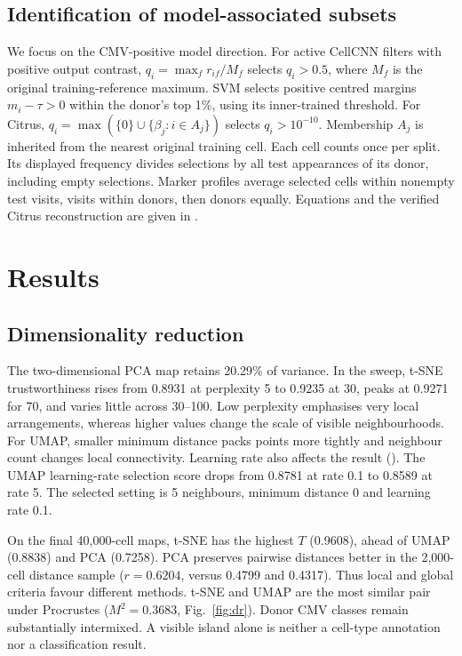 \documentclass[11pt,a4paper]{article}
\begin{document}
\subsection{Identification of model-associated subsets}
We focus on the CMV-positive model direction. For active CellCNN filters with positive output contrast, $q_i=\max_f r_{if}/M_f$ selects $q_i>0.5$, where $M_f$ is the original training-reference maximum. SVM selects positive centred margins $m_i-\tau>0$ within the donor's top 1\%, using its inner-trained threshold. For Citrus, $q_i=\max(\{0\}\cup\{\beta_j:i\in A_j\})$ selects $q_i>10^{-10}$. Membership $A_j$ is inherited from the nearest original training cell. Each cell counts once per split. Its displayed frequency divides selections by all test appearances of its donor, including empty selections. Marker profiles average selected cells within nonempty test visits, visits within donors, then donors equally. Equations and the verified Citrus reconstruction are given in .

\section{Results}
\subsection{Dimensionality reduction}
The two-dimensional PCA map retains 20.29\% of variance. In the sweep, t-SNE trustworthiness rises from 0.8931 at perplexity 5 to 0.9235 at 30, peaks at 0.9271 for 70, and varies little across 30--100. Low perplexity emphasises very local arrangements, whereas higher values change the scale of visible neighbourhoods. For UMAP, smaller minimum distance packs points more tightly and neighbour count changes local connectivity. Learning rate also affects the result (). The UMAP learning-rate selection score drops from 0.8781 at rate 0.1 to 0.8589 at rate 5. The selected setting is 5 neighbours, minimum distance 0 and learning rate 0.1.

On the final 40,000-cell maps, t-SNE has the highest $T$ (0.9608), ahead of UMAP (0.8838) and PCA (0.7258). PCA preserves pairwise distances better in the 2,000-cell distance sample ($r=0.6204$, versus 0.4799 and 0.4317). Thus local and global criteria favour different methods. t-SNE and UMAP are the most similar pair under Procrustes ($M^2=0.3683$, Fig.~\ref{fig:dr}). Donor CMV classes remain substantially intermixed. A visible island alone is neither a cell-type annotation nor a classification result.
\end{document}
